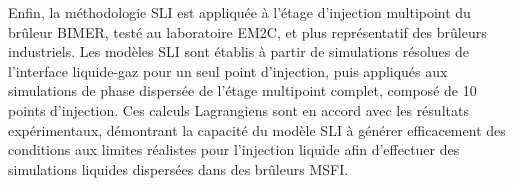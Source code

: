 Enfin, la méthodologie SLI est appliquée à l’étage d’injection multipoint du brûleur BIMER, testé au laboratoire EM2C, et plus représentatif des brûleurs industriels. Les modèles SLI sont établis à partir de simulations résolues de l’interface liquide-gaz pour un seul point d’injection, puis appliqués aux simulations de phase dispersée de l’étage multipoint complet, composé de 10 points d’injection. Ces calculs Lagrangiens sont en accord avec les résultats expérimentaux, démontrant la capacité du modèle SLI à générer efficacement des conditions aux limites réalistes pour l’injection liquide afin d’effectuer des simulations liquides dispersées dans des brûleurs MSFI.
